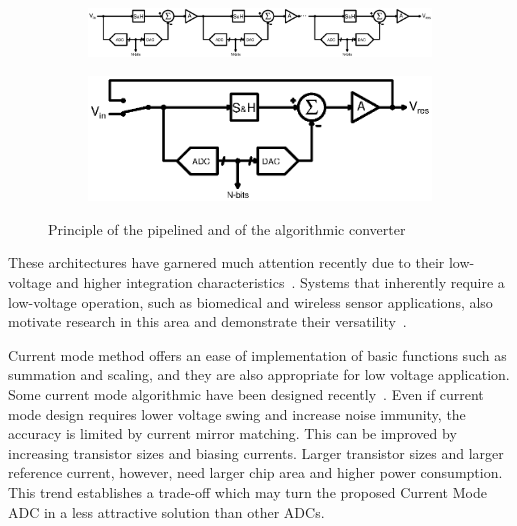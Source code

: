 \begin{figure}[htp]
	\centering
    \begin{subfigure}[b]{\textwidth}
        \includegraphics[width=\textwidth]{Chapter2/Figs/Vector/pipelined.ps}
        \vspace{2em}
        \label{fig:pipelined-principle}
	\end{subfigure}
	\begin{subfigure}[b]{0.4\textwidth}
        \includegraphics[width=\textwidth]{Chapter2/Figs/Vector/algorithmic.ps}
        \label{fig:algorithmic-principle}
    \end{subfigure}
	\caption{Principle of the pipelined and of the algorithmic converter}
	\label{fig:algo_desc}
\end{figure}

These architectures have garnered much attention recently due to their low-voltage and higher integration characteristics~\cite{Steyaert2012,Lee2011,SKLee2011,Brooks2009,Hershberg2012,YLim2015,YLim2015FD,Megawer2016,YCao2017}. Systems that inherently require a low-voltage operation, such as biomedical and wireless sensor applications, also motivate research in this area and demonstrate their versatility~\cite{Steyaert2012,Lee2011,SKLee2011}.


Current mode method offers an ease of implementation of basic functions such as summation and scaling, and they are also appropriate for low voltage application. Some current mode algorithmic have been designed recently~\cite{Nairn1990,Wang1991,Khodabndehloo2009,Bhatia2011}. Even if current mode design requires lower voltage swing and increase noise immunity, the accuracy is limited by current mirror matching. This can be improved by increasing transistor sizes and biasing currents. Larger transistor sizes and larger reference current, however, need larger chip area and higher power consumption. This trend establishes a trade-off which may turn the proposed Current Mode ADC in a less attractive solution than other ADCs\cite{Wang1991}.

